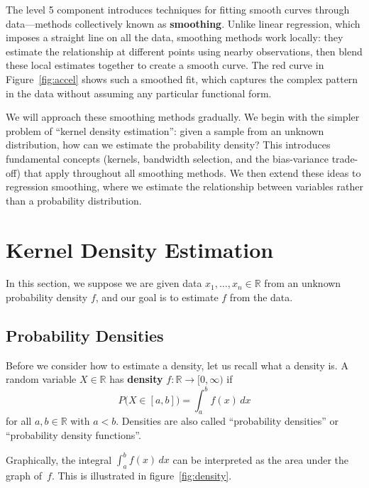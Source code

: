 \documentclass[
  a4paper,
]{article}
\theoremstyle{definition}
\theoremstyle{definition}
\theoremstyle{definition}
\theoremstyle{definition}
\theoremstyle{remark}
\begin{document}
The level 5 component introduces techniques for fitting smooth curves through
data---methods collectively known as \textbf{smoothing}. Unlike linear regression,
which imposes a straight line on all the data, smoothing methods work locally:
they estimate the relationship at different points using nearby observations,
then blend these local estimates together to create a smooth curve. The red
curve in Figure~\ref{fig:accel} shows such a smoothed fit, which captures the
complex pattern in the data without assuming any particular functional form.

We will approach these smoothing methods gradually. We begin with the simpler
problem of ``kernel density estimation'': given a sample from an unknown
distribution, how can we estimate the probability density? This introduces
fundamental concepts (kernels, bandwidth selection, and the bias-variance
trade-off) that apply throughout all smoothing methods. We then extend these
ideas to regression smoothing, where we estimate the relationship between
variables rather than a probability distribution.

\clearpage

\section{Kernel Density Estimation}\label{X01-KDE}

In this section, we suppose we are given data \(x_1,\ldots, x_n \in\mathbb{R}\) from an
unknown probability density \(f\), and our goal is to estimate \(f\) from the data.

\subsection{Probability Densities}\label{probability-densities}

Before we consider how to estimate a density, let us recall what a
density is. A random variable \(X \in \mathbb{R}\) has \textbf{density} \(f\colon
\mathbb{R}\to [0, \infty)\) if
\begin{equation*}
  P\bigl(X \in [a,b]\bigr)
  = \int_a^b f(x) \,dx
\end{equation*}
for all \(a, b\in\mathbb{R}\) with \(a < b\). Densities are also called
``probability densities'' or ``probability density functions''.

Graphically, the integral \(\int_a^b f(x) \,dx\) can be interpreted as the area
under the graph of~\(f\). This is illustrated in figure~\ref{fig:density}.
\end{document}
